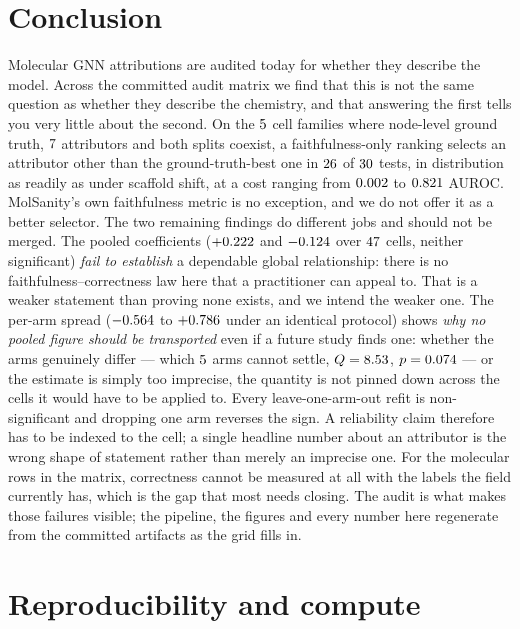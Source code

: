 \section{Conclusion}

Molecular GNN attributions are audited today for whether they describe the
model. Across the committed audit matrix we find that this is not the same
question as whether they describe the chemistry, and that answering the first
tells you very little about the second. On the $5{}$ cell families where
node-level ground truth, $7{}$ attributors and both splits
coexist, a faithfulness-only ranking selects an attributor other than the
ground-truth-best one in $26{}$ of $30{}$ tests, in
distribution as readily as under scaffold shift, at a cost ranging from
$0.002{}$ to $0.821{}$ AUROC. MolSanity's own faithfulness metric is
no exception, and we do not offer it as a better selector. The two remaining
findings do different jobs and should not be merged. The pooled coefficients
($+0.222{}$ and $-0.124{}$ over $47{}$ cells,
neither significant) \emph{fail to establish} a dependable global
relationship: there is no faithfulness--correctness law here that a
practitioner can appeal to. That is a weaker statement than proving none
exists, and we intend the weaker one. The per-arm spread ($-0.564{}$
to $+0.786{}$ under an identical protocol) shows \emph{why no pooled
figure should be transported} even if a future study finds one: whether the
arms genuinely differ --- which $5{}$ arms cannot settle,
$Q=8.53{}$, $p=0.074{}$ --- or the estimate is simply too imprecise,
the quantity is not pinned down across the cells it would have to be applied
to. Every leave-one-arm-out refit is non-significant and dropping one arm
reverses the sign. A reliability claim therefore has to be indexed to the
cell; a single headline number about an attributor is the wrong shape of
statement rather than merely an imprecise one.
For the \nNoGtCells{} molecular rows in the matrix, correctness cannot be
measured at all with the labels the field currently has, which is the gap that
most needs closing. The audit is what makes those failures visible; the
pipeline, the figures and every number here regenerate from the committed
artifacts as the grid fills in.

\section{Reproducibility and compute}
\label{sec:repro}

